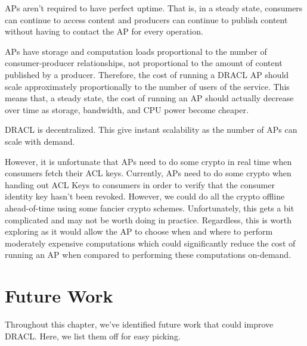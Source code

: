 \documentclass[pdftex,12pt,a4papaer,twoside,notitlepage]{report}
\begin{document}
APs aren't required to have perfect uptime. That is, in a steady state,
consumers can continue to access content and producers can continue to publish
content without having to contact the AP for every operation.

APs have storage and computation loads proportional to the number of
consumer-producer relationships, not proportional to the amount of content
published by a producer. Therefore, the cost of running a DRACL AP should scale
approximately proportionally to the number of users of the service. This means
that, a steady state, the cost of running an AP should actually decrease over
time as storage, bandwidth, and CPU power become cheaper.

DRACL is decentralized. This give instant scalability as the number of APs can
scale with demand.

However, it is unfortunate that APs need to do some crypto in real time when
consumers fetch their ACL keys. Currently, APs need to do some crypto when
handing out ACL Keys to consumers in order to verify that the consumer identity
key hasn't been revoked. However, we could do all the crypto offline
ahead-of-time using some fancier crypto schemes. Unfortunately, this gets a bit
complicated and may not be worth doing in practice. Regardless, this is worth
exploring as it would allow the AP to choose when and where to perform
moderately expensive computations which could significantly reduce the cost of
running an AP when compared to performing these computations on-demand.

\section{Future Work}

Throughout this chapter, we've identified future work that could improve DRACL.
Here, we list them off for easy picking.
\end{document}
